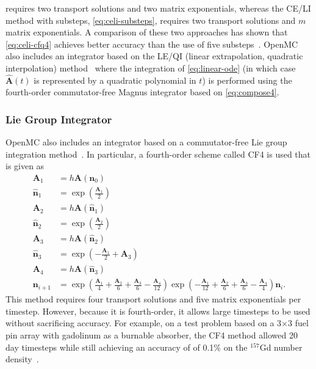\documentclass[3p,authoryear]{elsarticle}
\newcommand{\vect}[1]{\mathbf{#1}} %
\begin{document}
 requires two transport solutions and two matrix
exponentials, whereas the CE/LI method with substeps, \cref{eq:celi-substeps},
requires two transport solutions and $m$ matrix exponentials. A comparison of
these two approaches has shown that \cref{eq:celi-cfq4} achieves better accuracy
than the use of five substeps~\citep{josey2017phd}. OpenMC also includes an
integrator based on the LE/QI (linear extrapolation, quadratic interpolation)
method~\citep{isotalo2011ane2} where the integration of \cref{eq:linear-ode} (in
which case $\hat{\vect{A}}(t)$ is represented by a quadratic polynomial in $t$)
is performed using the fourth-order commutator-free Magnus integrator based on
\cref{eq:compose4}.

\subsubsection{Lie Group Integrator}

OpenMC also includes an integrator based on a commutator-free Lie group
integration method~\citep{celledoni2004fgcs}. In particular, a fourth-order
scheme called CF4 is used that is given as
\begin{equation}
  \begin{split}
    \vect{A}_1 &= h\vect{A}(\vect{n}_0) \\
    \hat{\vect{n}}_1 &= \exp \left ( \frac{\vect{A}_1}{2} \right ) \\
    \vect{A}_2 &= h\vect{A}(\hat{\vect{n}}_1) \\
    \hat{\vect{n}}_2 &= \exp \left ( \frac{\vect{A}_2}{2} \right ) \\
    \vect{A}_3 &= h \vect{A}(\hat{\vect{n}}_2) \\
    \hat{\vect{n}}_3 &= \exp \left ( -\frac{\vect{A}_1}{2}  + \vect{A}_3 \right ) \\
    \vect{A}_4 &= h\vect{A}(\hat{\vect{n}}_3) \\
    \vect{n}_{i+1} &= \exp \left ( \frac{\vect{A}_1}{4} + \frac{\vect{A}_2}{6} + \frac{\vect{A}_3}{6} - \frac{\vect{A}_4}{12} \right )
    \exp \left ( -\frac{\vect{A}_1}{12} + \frac{\vect{A}_2}{6} + \frac{\vect{A}_3}{6} - \frac{\vect{A}_4}{4} \right ) \vect{n}_i.
  \end{split}
\end{equation}
This method requires four transport solutions and five matrix exponentials per
timestep. However, because it is fourth-order, it allows large timesteps to be
used without sacrificing accuracy. For example, on a test problem based on a
3$\times$3 fuel pin array with gadolinum as a burnable absorber, the CF4 method
allowed 20 day timesteps while still achieving an accuracy of of 0.1\% on the
$^{157}$Gd number density~\citep{josey2017phd}.
\end{document}
